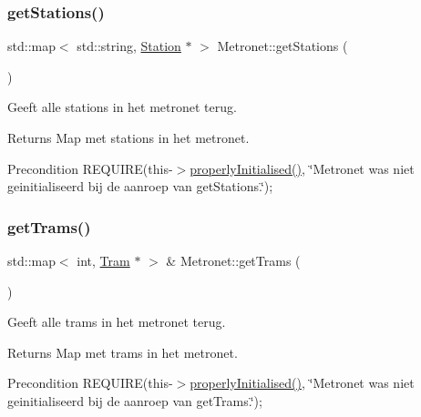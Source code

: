 \subsubsection{\texorpdfstring{get\+Stations()}{getStations()}}
{\footnotesize\ttfamily std\+::map$<$ std\+::string, \hyperlink{class_station}{Station} $\ast$ $>$ Metronet\+::get\+Stations (\begin{DoxyParamCaption}{ }\end{DoxyParamCaption})}



Geeft alle stations in het metronet terug. 

\begin{DoxyReturn}{Returns}
Map met stations in het metronet. 
\end{DoxyReturn}
\begin{DoxyPrecond}{Precondition}
R\+E\+Q\+U\+I\+RE(this-\/$>$\hyperlink{class_metronet_a3d2adce29a947f162924279b766de645}{properly\+Initialised()}, \char`\"{}\+Metronet was niet geinitialiseerd bij de aanroep van get\+Stations.\char`\"{}); 
\end{DoxyPrecond}
\mbox{\label{class_metronet_a9aab7bfe14dbd5f7e258a55007542c36}} 
\subsubsection{\texorpdfstring{get\+Trams()}{getTrams()}}
{\footnotesize\ttfamily std\+::map$<$ int, \hyperlink{class_tram}{Tram} $\ast$ $>$ \& Metronet\+::get\+Trams (\begin{DoxyParamCaption}{ }\end{DoxyParamCaption})}



Geeft alle trams in het metronet terug. 

\begin{DoxyReturn}{Returns}
Map met trams in het metronet. 
\end{DoxyReturn}
\begin{DoxyPrecond}{Precondition}
R\+E\+Q\+U\+I\+RE(this-\/$>$\hyperlink{class_metronet_a3d2adce29a947f162924279b766de645}{properly\+Initialised()}, \char`\"{}\+Metronet was niet geinitialiseerd bij de aanroep van get\+Trams.\char`\"{}); 
\end{DoxyPrecond}
\mbox{\label{class_metronet_a116ec9674637a45ff59cbb2cebb8dd21}} 

